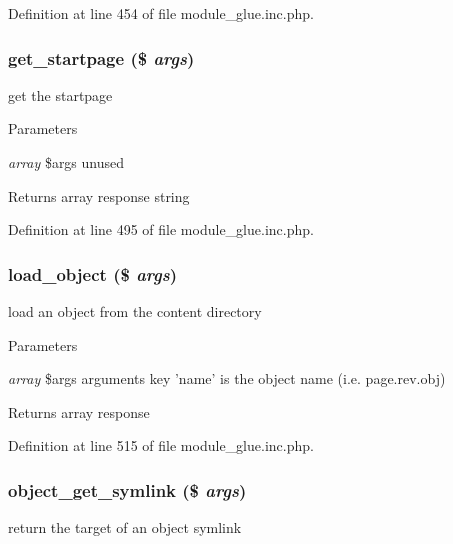Definition at line 454 of file module\_\-glue.inc.php.

\hypertarget{module__glue_8inc_8php_a5dd5e5f68b79a78901c25ce850b3eacf}{
\subsubsection[{get\_\-startpage}]{\setlength{\rightskip}{0pt plus 5cm}get\_\-startpage (\$ {\em args})}}
\label{module__glue_8inc_8php_a5dd5e5f68b79a78901c25ce850b3eacf}
get the startpage


\begin{DoxyParams}{Parameters}
\item[{\em array}]\$args unused \end{DoxyParams}
\begin{DoxyReturn}{Returns}
array response string 
\end{DoxyReturn}


Definition at line 495 of file module\_\-glue.inc.php.

\hypertarget{module__glue_8inc_8php_ac6b5ed5ff055ccb4d07ad17cf78d5a11}{
\subsubsection[{load\_\-object}]{\setlength{\rightskip}{0pt plus 5cm}load\_\-object (\$ {\em args})}}
\label{module__glue_8inc_8php_ac6b5ed5ff055ccb4d07ad17cf78d5a11}
load an object from the content directory


\begin{DoxyParams}{Parameters}
\item[{\em array}]\$args arguments key 'name' is the object name (i.e. page.rev.obj) \end{DoxyParams}
\begin{DoxyReturn}{Returns}
array response 
\end{DoxyReturn}


Definition at line 515 of file module\_\-glue.inc.php.

\hypertarget{module__glue_8inc_8php_aa9618d306b7ee5bd9e5d6a0be268ed44}{
\subsubsection[{object\_\-get\_\-symlink}]{\setlength{\rightskip}{0pt plus 5cm}object\_\-get\_\-symlink (\$ {\em args})}}
\label{module__glue_8inc_8php_aa9618d306b7ee5bd9e5d6a0be268ed44}
return the target of an object symlink


